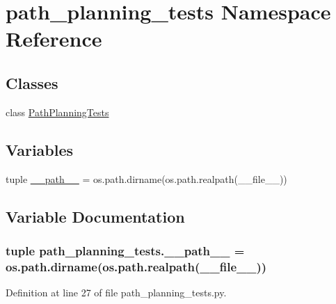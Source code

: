 \hypertarget{namespacepath__planning__tests}{\section{path\-\_\-planning\-\_\-tests Namespace Reference}
\label{namespacepath__planning__tests}
}
\subsection*{Classes}
\begin{DoxyCompactItemize}
\item 
class \hyperlink{classpath__planning__tests_1_1PathPlanningTests}{Path\-Planning\-Tests}
\end{DoxyCompactItemize}
\subsection*{Variables}
\begin{DoxyCompactItemize}
\item 
tuple \hyperlink{namespacepath__planning__tests_af54df6023de4c984ebbde0db76f68136}{\-\_\-\-\_\-path\-\_\-\-\_\-} = os.\-path.\-dirname(os.\-path.\-realpath(\-\_\-\-\_\-file\-\_\-\-\_\-))
\end{DoxyCompactItemize}


\subsection{Variable Documentation}
\hypertarget{namespacepath__planning__tests_af54df6023de4c984ebbde0db76f68136}{
\subsubsection[{\-\_\-\-\_\-path\-\_\-\-\_\-}]{\setlength{\rightskip}{0pt plus 5cm}tuple path\-\_\-planning\-\_\-tests.\-\_\-\-\_\-path\-\_\-\-\_\- = os.\-path.\-dirname(os.\-path.\-realpath(\-\_\-\-\_\-file\-\_\-\-\_\-))}}\label{namespacepath__planning__tests_af54df6023de4c984ebbde0db76f68136}


Definition at line 27 of file path\-\_\-planning\-\_\-tests.\-py.

